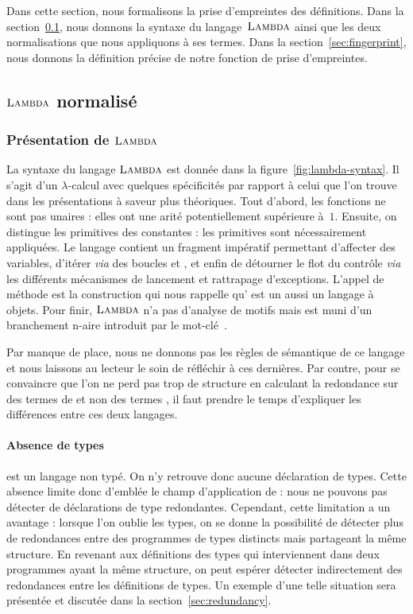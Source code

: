 
Dans cette section, nous formalisons la prise d'empreintes des
définitions. Dans la section~\ref{sec:lambda}, nous donnons la syntaxe
du langage~$\textsc{Lambda}$ ainsi que les deux normalisations que nous
appliquons à ses termes. Dans la section~\ref{sec:fingerprint},
nous donnons la définition précise de notre fonction de prise
d'empreintes.

\subsection{$\textsc{Lambda}$ normalisé}
\label{sec:lambda}

\subsubsection{Présentation de $\textsc{Lambda}$}



La syntaxe du langage $\textsc{Lambda}$ est donnée dans la
figure~\ref{fig:lambda-syntax}. Il s'agit d'un $\lambda$-calcul avec
quelques spécificités par rapport à celui que l'on trouve dans les
présentations à saveur plus théoriques. Tout d'abord, les fonctions ne
sont pas unaires : elles ont une arité potentiellement supérieure
à~$1$. Ensuite, on distingue les primitives des constantes : les
primitives sont nécessairement appliquées. Le langage contient un
fragment impératif permettant d'affecter des variables, d'itérer
\textit{via} des boucles  et , et enfin de
détourner le flot du contrôle \textit{via} les différents mécanismes
de lancement et rattrapage d'exceptions. L'appel de méthode est la
construction qui nous rappelle qu'{\OCaml} est un aussi un langage à
objets. Pour finir, $\textsc{Lambda}$ n'a pas d'analyse de motifs mais est
muni d'un branchement n-aire introduit par le mot-clé~.

Par manque de place, nous ne donnons pas les règles de sémantique de
ce langage et nous laissons au lecteur le soin de réfléchir à ces
dernières. Par contre, pour se convaincre que l'on ne perd pas trop de
structure en calculant la redondance sur des termes de {\LambdaCode}
et non des termes {\OCaml}, il faut prendre le temps d'expliquer les
différences entre ces deux langages.

\paragraph{Absence de types}
{\LambdaCode} est un langage non typé. On n'y retrouve donc aucune
déclaration de types. Cette absence limite donc d'emblée le champ
d'application de {\Asak}: nous ne pouvons pas détecter de déclarations
de type redondantes. Cependant, cette limitation a un avantage :
lorsque l'on oublie les types, on se donne la possibilité de détecter
plus de redondances entre des programmes de types distincts mais
partageant la même structure. En revenant aux définitions des types
qui interviennent dans deux programmes ayant la même structure, on
peut espérer détecter indirectement des redondances entre les
définitions de types.
%
Un exemple d'une telle situation sera présentée
et discutée dans la section~\ref{sec:redundancy}.

